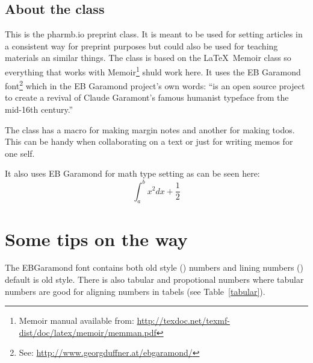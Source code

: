 \documentclass[watermark]{pbpreprint}
\begin{document}
\subsection{About the class}
This is the pharm\textcolor{uured}{b.io} preprint class. It is meant to be used
for setting articles in a consistent way for preprint purposes but could also
be used for teaching materials an similar things. The class is based on the
\LaTeX\ Memoir class so everything that works with Memoir\footnote{Memoir
manual available from:
\url{http://texdoc.net/texmf-dist/doc/latex/memoir/memman.pdf}} shuld work
here. It uses the EB Garamond font\footnote{See:
\url{http://www.georgduffner.at/ebgaramond/}} which in the EB Garamond
project's own words: ``is an open source project to create a revival of Claude
Garamont’s famous humanist typeface from the mid-16th century.''

The class has a macro for making margin notes and
another for making todos. This can be handy when
collaborating on a text or just for writing memos for one self.

It also uses EB Garamond for math type setting as can be seen here:
\begin{equation}
    \int_{a}^{b} x^2 dx + \frac{1}{2}
\end{equation}


\section{Some tips on the way}
The EBGaramond font contains both old style () numbers and lining numbers () default is old style. There is also tabular and propotional numbers where
tabular numbers are good for aligning numbers in tabels (see
Table~\ref{tabular}). 
\end{document}
